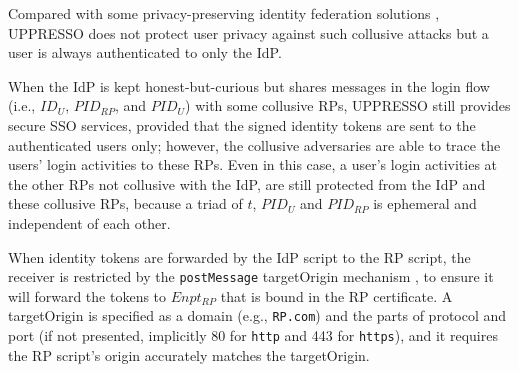 


\vspace{0.8mm}
Compared with some privacy-preserving identity federation solutions \cite{ELPASSO,UnlimitID,hyperledge-idemix,PseudoID,Opaak,uprov},
UPPRESSO does not protect user privacy against such collusive attacks
    but a user is always authenticated to only the IdP.

When the IdP is kept honest-but-curious but shares messages in the login flow (i.e.,
$ID_U$, $PID_{RP}$, and $PID_U$)
        with some collusive RPs,
UPPRESSO still provides secure SSO services,
    provided that the signed identity tokens are sent to the authenticated users only;
however,
    the collusive adversaries are able to trace the users' login activities to these RPs.
Even in this case, a user's login activities at the other RPs not collusive with the IdP,
        are still protected from the IdP and these collusive RPs,
        because a triad of $t$, $PID_U$ and $PID_{RP}$ is ephemeral and independent of each other.
%


\vspace{0.8mm}
When identity tokens are forwarded by the IdP script to the RP script, %
    the receiver is restricted by the \verb+postMessage+ targetOrigin mechanism \cite{postm-targeto},
        to ensure it will forward the tokens to $Enpt_{RP}$
        that is bound in the RP certificate.
A targetOrigin is specified as
    a domain (e.g., \verb+RP.com+) and the parts of protocol and port (if not presented, implicitly 80 for \verb+http+ and 443 for \verb+https+),
        and it requires the RP script's origin accurately matches the targetOrigin.

